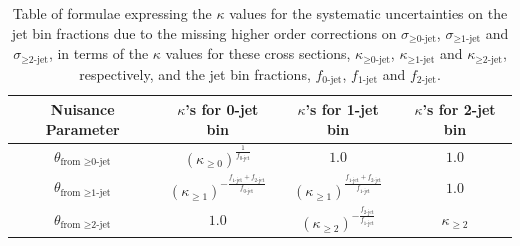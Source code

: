 \begin{table}[!htbp]
\begin{center}
\begin{tabular}{c|ccc}

\hline
Nuisance Parameter & $\kappa$'s for 0-jet bin   & $\kappa$'s for 1-jet bin  & $\kappa$'s for 2-jet bin                       \\
\hline \hline
$\theta_{\textrm{from } \ge \textrm{0-jet}}$  & $ (\kappa_{\geq 0})^{\frac{1}{f_\textrm{0-jet}}}$    & $1.0$ & $1.0$                                            \\
$\theta_{\textrm{from } \ge \textrm{1-jet}}$  & $(\kappa_{\geq 1})^{- \frac{f_\textrm{1-jet}+f_\textrm{2-jet}}{f_\textrm{0-jet}}}$ & $(\kappa_{\geq 1})^{\frac{f_\textrm{1-jet}+f_\textrm{2-jet}}{f_\textrm{1-jet}}}$  & $1.0$                                            \\
$\theta_{\textrm{from } \ge \textrm{2-jet}}$  & $1.0$ & $(\kappa_{\geq 2})^{- \frac{f_\textrm{2-jet}}{f_\textrm{1-jet}}} $     & $\kappa_{\geq 2}$ \\
\hline

\end{tabular}
\caption{Table of formulae expressing the $\kappa$ values for the systematic uncertainties on the
jet bin fractions due to the missing higher order corrections on 
$\sigma_{\ge\textrm{0-jet}}$, $\sigma_{\ge\textrm{1-jet}}$ and $\sigma_{\ge\textrm{2-jet}}$,
in terms of the $\kappa$ values for these cross sections, 
$\kappa_{\ge\textrm{0-jet}}$, $\kappa_{\ge\textrm{1-jet}}$ and $\kappa_{\ge\textrm{2-jet}}$, respectively, 
and the jet bin fractions, 
$f_{\textrm{0-jet}}$, $f_{\textrm{1-jet}}$ and $f_{\textrm{2-jet}}$.
}
\label{tab:jetbinformula}
\end{center}
\end{table}

